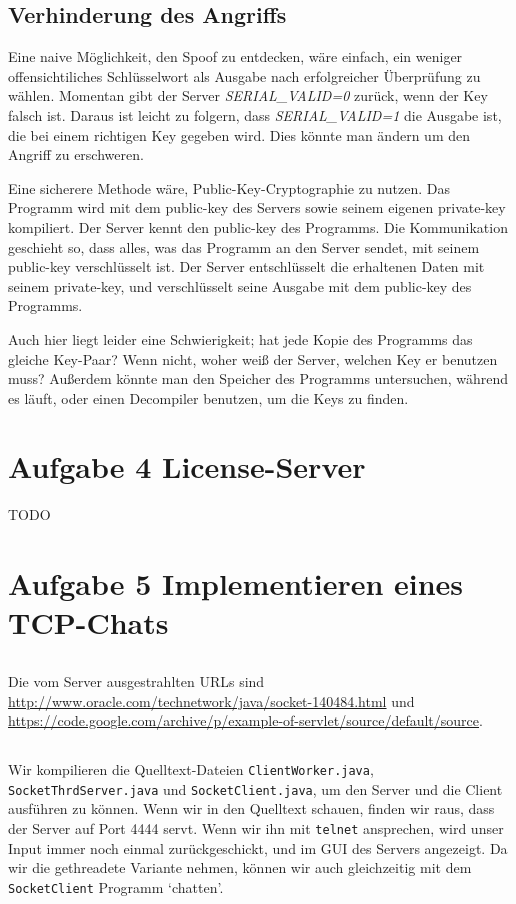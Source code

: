 \documentclass[10pt,a4paper]{article}
\begin{document}
\subsection{Verhinderung des Angriffs}
Eine naive Möglichkeit, den Spoof zu entdecken, wäre einfach, ein weniger offensichtiliches
Schlüsselwort als Ausgabe nach erfolgreicher Überprüfung zu wählen. Momentan gibt
der Server \textit{SERIAL\_VALID=0} zurück, wenn der Key falsch ist.
Daraus ist leicht zu folgern, dass \textit{SERIAL\_VALID=1} die Ausgabe ist, die
bei einem richtigen Key gegeben wird. Dies könnte man ändern um den Angriff
zu erschweren.

Eine sicherere Methode wäre, Public-Key-Cryptographie zu nutzen. Das Programm wird
mit dem public-key des Servers sowie seinem eigenen private-key kompiliert.
Der Server kennt den public-key des Programms. Die Kommunikation geschieht so,
dass alles, was das Programm an den Server sendet, mit seinem public-key verschlüsselt ist.
Der Server entschlüsselt die erhaltenen Daten mit seinem private-key, und
verschlüsselt seine Ausgabe mit dem public-key des Programms.

Auch hier liegt leider eine Schwierigkeit; hat jede Kopie des Programms das gleiche
Key-Paar? Wenn nicht, woher weiß der Server, welchen Key er benutzen muss?
Außerdem könnte man den Speicher des Programms untersuchen, während es läuft,
oder einen Decompiler benutzen, um die Keys zu finden.

\section{Aufgabe 4 License-Server}
TODO

\section{Aufgabe 5 Implementieren eines TCP-Chats}
\setcounter{subsection}{0}
\subsection{}
Die vom Server ausgestrahlten URLs sind
\url{http://www.oracle.com/technetwork/java/socket-140484.html} und
\url{https://code.google.com/archive/p/example-of-servlet/source/default/source}.

\subsection{}
Wir kompilieren die Quelltext-Dateien \texttt{ClientWorker.java},
\texttt{SocketThrdServer.java} und \texttt{SocketClient.java},
um den Server und die Client ausführen zu können.
Wenn wir in den Quelltext schauen, finden wir raus, dass der Server
auf Port 4444 servt. Wenn wir ihn mit \texttt{telnet} ansprechen,
wird unser Input immer noch einmal zurückgeschickt, und im GUI des Servers
angezeigt. Da wir die gethreadete Variante nehmen, können wir auch gleichzeitig
mit dem \texttt{SocketClient} Programm `chatten'.
\end{document}

